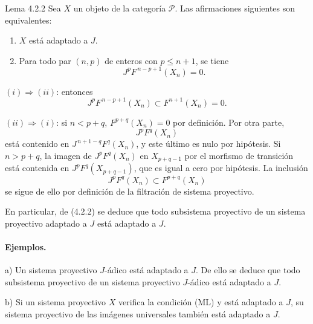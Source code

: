 \begin{statement}{Lema 4.2.2}
Sea \(X\) un objeto de la categoría \(\mathcal P\). Las afirmaciones siguientes son equivalentes:
\begin{enumerate}[label=\textup{(\roman*)}]
\item \(X\) está adaptado a \(J\).
\item Para todo par \((n,p)\) de enteros con \(p\le n+1\), se tiene
\[
J^pF^{\,n-p+1}(X_n)=0 .
\]
\end{enumerate}
\end{statement}

\begin{prooftext}
\((i)\Rightarrow(ii)\): entonces
\[
J^pF^{\,n-p+1}(X_n)\subset F^{n+1}(X_n)=0.
\]

\((ii)\Rightarrow(i)\): si \(n<p+q\), \(F^{p+q}(X_n)=0\) por definición. Por otra parte,
\[
J^pF^q(X_n)
\]
está contenido en \(J^{\,n+1-q}F^q(X_n)\), y este último es nulo por hipótesis. Si \(n>p+q\), la imagen de \(J^pF^q(X_n)\) en \(X_{p+q-1}\) por el morfismo de transición está contenida en \(J^pF^q(X_{p+q-1})\), que es igual a cero por hipótesis. La inclusión
\[
J^pF^q(X_n)\subset F^{p+q}(X_n)
\]
se sigue de ello por definición de la filtración de sistema proyectivo.

En particular, de (4.2.2) se deduce que todo subsistema proyectivo de un sistema proyectivo adaptado a \(J\) está adaptado a \(J\).
\end{prooftext}

\paragraph{Ejemplos.}
a) Un sistema proyectivo \(J\)-ádico está adaptado a \(J\). De ello se deduce que todo subsistema proyectivo de un sistema proyectivo \(J\)-ádico está adaptado a \(J\).

b) Si un sistema proyectivo \(X\) verifica la condición (ML) y está adaptado a \(J\), su sistema proyectivo de las imágenes universales también está adaptado a \(J\).
